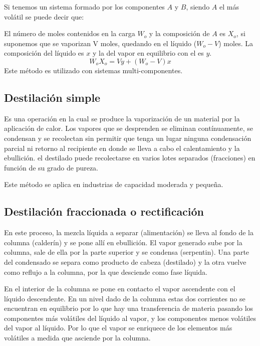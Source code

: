\documentclass[11pt,openany]{book}
\begin{document}
Si tenemos un sistema formado por los componentes $A$ y $B$, siendo $A$ el más volátil se puede decir que:

El número de moles contenidos en la carga $W_o$ y la composición de $A$ es $X_o$, si suponemos que se 
vaporizan V moles, quedando en el líquido ($W_o - V$) moles. La composición del líquido es $x$ y la del 
vapor en equilibrio con el es $y$.
\begin{equation}W_o X_o = V y +(W_o -V) x\end{equation}
Este método es utilizado con sistemas multi-componentes.

\subsection {Destilación simple}

Es una operación en la cual se produce la vaporización de un material por la aplicación de calor. Los 
vapores que se desprenden se eliminan contínuamente, se condensan y se recolectan sin permitir 
que tenga un lugar ninguna condensación parcial ni retorno al recipiente en donde se lleva a cabo 
el calentamiento y la ebullición. el destilado puede recolectarse en varios lotes separados
 (fracciones) en función de su grado de pureza.

 Este método se aplica en industrias de capacidad moderada y pequeña.

 \subsection{Destilación fraccionada o rectificación}

En este proceso, la mezcla líquida a separar (alimentación) se lleva al fondo de la columna (calderín) y 
se pone allí en ebullición. El vapor generado sube por la columna, sale de ella por la parte superior y 
se condensa (serpentin). Una parte del condensado se separa como producto de cabeza (destilado) y la otra 
vuelve como reflujo a la columna, por la que desciende como fase líquida.

En el interior de la columna se pone en contacto el vapor ascendente con el líquido descendente. 
En un nivel dado de la columna estas dos corrientes no se encuentran en equilibrio por lo que hay 
una transferencia de materia pasando los componentes más volátiles del líquido al vapor, y los 
componentes menos volátiles del vapor al líquido. Por lo que el vapor se enriquece de los 
elementos más volátiles a medida que asciende por la columna.
\end{document}
